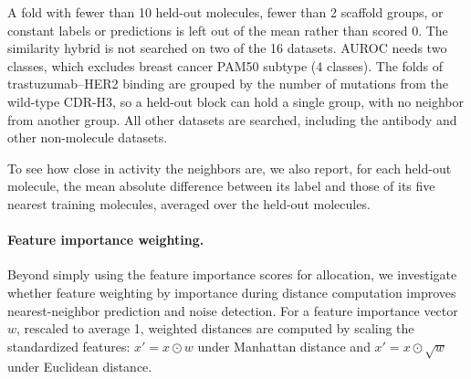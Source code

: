 A fold with fewer than 10 held-out molecules, fewer than 2 scaffold groups, or constant labels or predictions is left out of the mean rather than scored 0. The similarity hybrid is not searched on two of the 16 datasets. AUROC needs two classes, which excludes breast cancer PAM50 subtype (4 classes). The folds of trastuzumab--HER2 binding are grouped by the number of mutations from the wild-type CDR-H3, so a held-out block can hold a single group, with no neighbor from another group. All other datasets are searched, including the antibody and other non-molecule datasets.

To see how close in activity the neighbors are, we also report, for each held-out molecule, the mean absolute difference between its label and those of its five nearest training molecules, averaged over the held-out molecules.


\paragraph{Feature importance weighting.}

Beyond simply using the feature importance scores for allocation, we investigate whether feature weighting by importance during distance computation improves nearest-neighbor prediction and noise detection. For a feature importance vector $w$, rescaled to average 1, weighted distances are computed by scaling the standardized features: $x' = x \odot w$ under Manhattan distance and $x' = x \odot \sqrt{w}$ under Euclidean distance.


